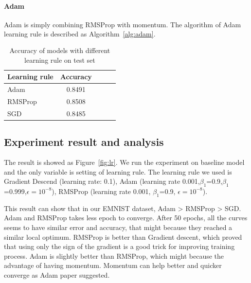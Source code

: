 \documentclass{article}
\begin{document}
\paragraph{Adam} Adam \citep{DBLP:journals/corr/KingmaB14} is simply combining RMSProp with momentum.  The algorithm of Adam learning rule is described as Algorithm~\ref{alg:adam}.

 


\begin{table}[tb]
\vskip 3mm
\begin{center}
\begin{small}
\begin{sc}
\begin{tabular}{lcccr}
\hline
\abovespace\belowspace
Learning rule & Accuracy \\
\hline
\abovespace
Adam    	& 0.8491 	\\
RMSProp	 	& 0.8508 	\\
SGD			& 0.8485 	\\

\hline
\end{tabular}
\end{sc}
\end{small}
\caption{Accuracy of models with different learning rule on test set}
\label{tab:lr}
\end{center}
\vskip -3mm
\end{table}





\subsection{Experiment result and analysis}
The result is showed as Figure~\ref{fig:lr}. We run the experiment on baseline model and the only variable is setting of learning rule. The learning rule we used is Gradient Descend (learning rate: 0.1), Adam (learning rate 0.001,$\beta_1$=0.9,$\beta_1$=0.999,$\epsilon=10^{-8} $), RMSProp (learning rate 0.001, $\beta_1$=0.9, $\epsilon=10^{-8} $).

 This result can show that in our EMNIST dataset,  Adam > RMSProp > SGD. Adam and RMSProp takes less epoch to converge. After 50 epochs, all the curves seems to have similar error and accuracy, that might because they reached a similar local optimum. RMSProp is better than Gradient descent, which proved that using only the sign of the gradient is a good trick for improving training process. Adam is slightly better than RMSProp, which might because the advantage of having momentum. Momentum can help better and quicker converge as Adam paper suggested.
\end{document}
